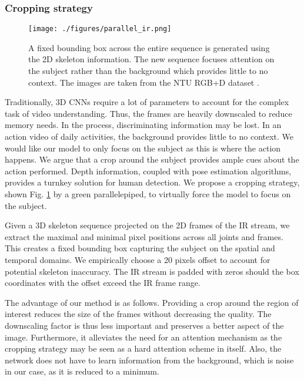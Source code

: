 \documentclass[letterpaper, 10 pt, conference]{ieeeconf}
\begin{document}
\subsubsection{Cropping strategy} \label{cropping_strategy}

\begin{figure}[t]
  \centering
  \texttt{[image: ./figures/parallel\_ir.png]}
  \caption{A fixed bounding box across the entire sequence is generated using the 2D skeleton information. The new sequence focuses attention on the subject rather than the background which provides little to no context. The images are taken from the NTU RGB+D dataset \cite{shahroudy2016ntu}.}
  \label{parallel_ir}
\end{figure}

Traditionally, 3D CNNs require a lot of parameters to account for the complex task of video understanding. Thus, the frames are heavily downscaled to reduce memory needs. In the process, discriminating information may be lost. In an action video of daily activities, the background provides little to no context. We would like our model to only focus on the subject as this is where the action happens. We argue that a crop around the subject provides ample cues about the action performed. Depth information, coupled with pose estimation algorithms, provides a turnkey solution for human detection. We propose a cropping strategy, shown Fig. \ref{parallel_ir} by a green parallelepiped, to virtually force the model to focus on the subject.

Given a 3D skeleton sequence projected on the 2D frames of the IR stream, we extract the maximal and minimal pixel positions across all joints and frames. This creates a fixed bounding box capturing the subject on the spatial and temporal domains. We empirically choose a 20 pixels offset to account for potential skeleton inaccuracy. The IR stream is padded with zeros should the box coordinates with the offset exceed the IR frame range. 

The advantage of our method is as follows. Providing a crop around the region of interest reduces the size of the frames without decreasing the quality. The downscaling factor is thus less important and preserves a better aspect of the image. Furthermore, it alleviates the need for an attention mechanism as the cropping strategy may be seen as a hard attention scheme in itself. Also, the network does not have to learn information from the background, which is noise in our case, as it is reduced to a minimum.
\end{document}

